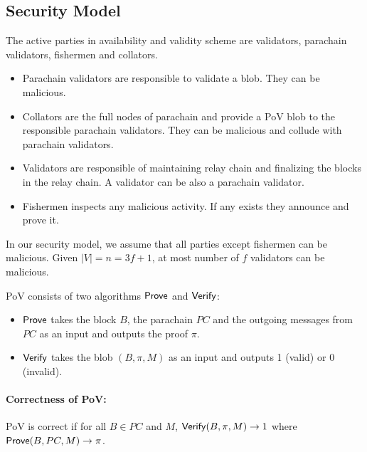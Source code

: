 \subsection{Security Model}



The active parties in availability and validity scheme are validators, parachain validators, fishermen and collators. 




\begin{itemize}

\item Parachain validators are responsible to validate a blob. They can be malicious.
\item Collators are the full nodes of parachain and provide a PoV blob to the responsible parachain validators. They can be malicious and collude with parachain validators.
\item Validators are responsible of maintaining relay chain and finalizing the blocks in the relay chain. A validator can be also a parachain validator. 
\item Fishermen inspects any malicious activity. If any exists they announce and prove it.  



\end{itemize}

In our security model, we assume that all parties except fishermen can be malicious. Given $|V| = n = 3f + 1$, at most number of $f$ validators can be malicious.


\begin{definition}\label{def:pob}
PoV consists of two algorithms $\mathsf{Prove}$ and $\mathsf{Verify}$:
\begin{itemize}
    \item $\mathsf{Prove}$  takes the block $B$, the parachain $PC$ and the outgoing messages from $PC$ as an input and outputs the proof $\pi$.
    \item $\mathsf{Verify}$  takes the blob $(B,\pi,M)$ as an input and outputs 1 (valid) or 0 (invalid).
\end{itemize}
\end{definition}
\paragraph{Correctness of PoV:} PoV is correct if for all $B \in PC$ and $M$, $\mathsf{Verify}(B,\pi,M)\rightarrow 1$ where $\mathsf{Prove}(B, PC,M)\rightarrow \pi$.

